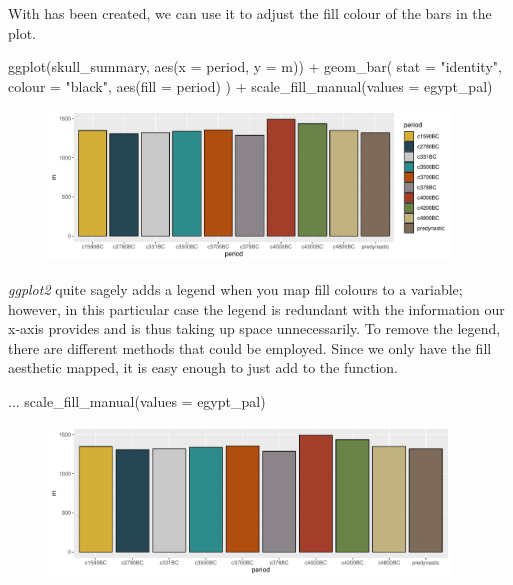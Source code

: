 With  has been created, we can use it to adjust the fill colour of the bars in the plot.

\begin{inR}
ggplot(skull_summary, aes(x = period, y = m)) +
  geom_bar(
    stat = "identity",
    colour = "black",
    aes(fill = period)
  ) +
  scale_fill_manual(values = egypt_pal)
\end{inR}

\vspace{2em}

\begin{figure}[H]
\includegraphics[width = 0.95\textwidth]{graphics/ch3Figs/bar_2.pdf}
\end{figure}

\textit{ggplot2} quite sagely adds a legend when you map fill colours to a variable; however, in this particular case the legend is redundant with the information our x-axis provides and is thus taking up space unnecessarily. To remove the legend, there are different methods that could be employed. Since we only have the fill aesthetic mapped, it is easy enough to just add  to the  function.

\begin{inR}
...
  scale_fill_manual(values = egypt_pal)
\end{inR}

\vspace{2em}

\begin{figure}[H]
\includegraphics[width = 0.95\textwidth]{graphics/ch3Figs/bar_3.pdf}
\end{figure}

